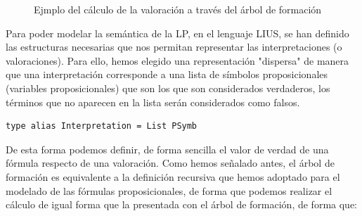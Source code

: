 \documentclass[a4paper]{report}
\begin{document}
\begin{figure}[H]
\centering
{}
\caption{Ejmplo del cálculo de la valoración a través del árbol de formación}
\end{figure}

Para poder modelar la semántica de la LP, en el lenguaje LIUS, se han definido las estructuras necesarias que nos permitan representar las interpretaciones (o valoraciones). Para ello, hemos elegido una representación "dispersa" de manera que una interpretación corresponde a una lista de símbolos proposicionales (variables proposicionales) que son los que son considerados verdaderos, los términos que no aparecen en la lista serán considerados como falsos.\\

\begin{lstlisting}[caption= Definición de Interpretación como Lista de Símbolos Proposicionales]
type alias Interpretation = List PSymb
\end{lstlisting}

De esta forma podemos definir, de forma sencilla el valor de verdad de una fórmula respecto de una valoración. Como hemos señalado antes, el árbol de formación es equivalente a la definición recursiva que hemos adoptado para el modelado de las fórmulas proposicionales, de forma que podemos realizar el cálculo de igual forma que la presentada con el árbol de formación, de forma que:
\end{document}
